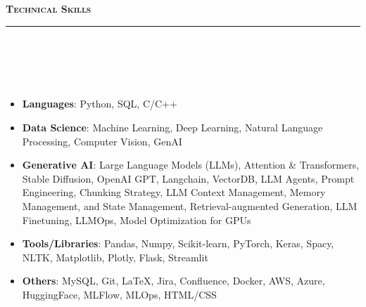 \documentclass[a4paper,10pt]{article}
\newcommand{\lsep}{-0.5cm}
\newcommand{\resheading}[1]{{\small
        {
            \begin{minipage}
                {0.992\textwidth}\textbf{{\textsc{#1 \vphantom{p\^{E}} }}}
                \\[-0.3cm]
                \hrule
            \end{minipage}
            \\[-0.5cm]
        }
 }}
\begin{document}
\vspace{4pt}
\noindent
\resheading{\textbf{\large Technical Skills}}\\[\lsep] 
\\[-0.3cm]
\begin{itemize}
  \item \textbf{Languages}: Python, SQL, C/C++\\[-0.5cm]
  \item \textbf{Data Science}: Machine Learning, Deep Learning, Natural Language Processing, Computer Vision, GenAI  \\[-0.5cm]
  \item \textbf{Generative AI}: Large Language Models (LLMs), Attention \& Transformers, Stable Diffusion, OpenAI GPT, Langchain, VectorDB, LLM Agents, Prompt Engineering, Chunking Strategy, LLM Context Management, Memory Management, and State Management, Retrieval-augmented Generation, LLM Finetuning, LLMOps, Model Optimization for GPUs \\[-0.5cm]
  \item \textbf{Tools/Libraries}: Pandas, Numpy, Scikit-learn, PyTorch, Keras, Spacy, NLTK, Matplotlib, Plotly, Flask, Streamlit \\[-0.5cm]
  \item \textbf{Others}: MySQL, Git, LaTeX, Jira, Confluence, Docker, AWS, Azure, HuggingFace, MLFlow, MLOps, HTML/CSS\\[-0.4cm]
\end{itemize}

\end{document}
